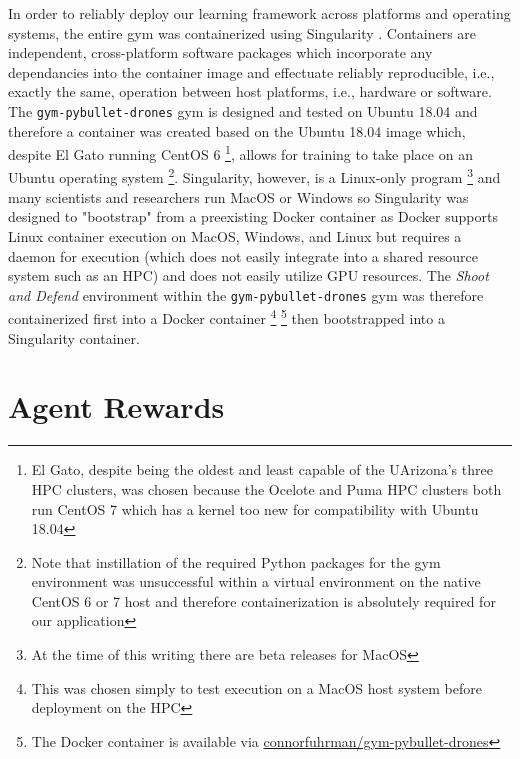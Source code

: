 \documentclass{article}
\begin{document}
\noindent
In order to reliably deploy our learning framework across platforms and operating systems, the entire gym was containerized using Singularity \cite{singularity}. 
Containers are independent, cross-platform software packages which incorporate any dependancies into the container image and effectuate reliably reproducible, i.e., exactly the same, operation between host platforms, i.e., hardware or software. 
The \texttt{gym-pybullet-drones} gym is designed and tested on Ubuntu 18.04 and therefore a container was created based on the Ubuntu 18.04 image which, despite El Gato running CentOS 6 \footnote{El Gato, despite being the oldest and least capable of the UArizona's three HPC clusters, was chosen because the Ocelote and Puma HPC clusters both run CentOS 7 which has a kernel too new for compatibility with Ubuntu 18.04}, allows for training to take place on an Ubuntu operating system \footnote{Note that instillation of the required Python packages for the gym environment was unsuccessful within a virtual environment on the native CentOS 6 or 7 host and therefore containerization is absolutely required for our application}. 
Singularity, however, is a Linux-only program \footnote{At the time of this writing there are beta releases for MacOS} and many scientists and researchers run MacOS or Windows so Singularity was designed to "bootstrap" from a preexisting Docker \cite{docker} container as Docker supports Linux container execution on MacOS, Windows, and Linux but requires a daemon for execution (which does not easily integrate into a shared resource system such as an HPC) and does not easily utilize GPU resources. 
The \textit{Shoot and Defend} environment within the \texttt{gym-pybullet-drones} gym was therefore containerized first into a Docker container \footnote{This was chosen simply to test execution on a MacOS host system before deployment on the HPC} \footnote{The Docker container is available via \href{https://hub.docker.com/repository/docker/connorfuhrman/gym-pybullet-drones}{connorfuhrman/gym-pybullet-drones}} then bootstrapped into a Singularity container. 

\clearpage 
\appendix
\section{Agent Rewards}\label{app:rewards}
\end{document}
